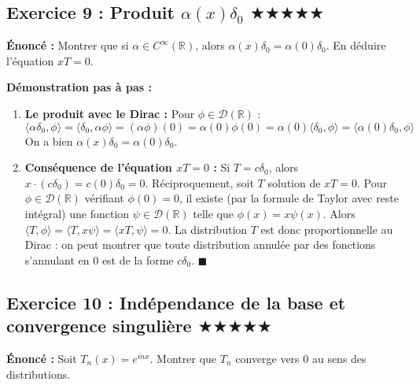 \documentclass[11pt,a4paper]{article}
\begin{document}
\subsection*{Exercice 9 : Produit $\alpha(x) \delta_0$ \quad $\bigstar\bigstar\bigstar\bigstar\bigstar$}

\textbf{Énoncé :}
Montrer que si $\alpha \in C^\infty(\mathbb{R})$, alors $\alpha(x) \delta_0 = \alpha(0) \delta_0$. En déduire l'équation $x T = 0$.

\textbf{Démonstration pas à pas :}
\begin{enumerate}
\item \textbf{Le produit avec le Dirac :} Pour $\phi \in \mathcal{D}(\mathbb{R})$ :
   $$ \langle \alpha \delta_0, \phi \rangle = \langle \delta_0, \alpha \phi \rangle = (\alpha \phi)(0) = \alpha(0) \phi(0) = \alpha(0) \langle \delta_0, \phi \rangle = \langle \alpha(0) \delta_0, \phi \rangle $$
   On a bien $\alpha(x) \delta_0 = \alpha(0) \delta_0$.
\item \textbf{Conséquence de l'équation $x T = 0$ :} Si $T = c \delta_0$, alors $x \cdot (c \delta_0) = c (0) \delta_0 = 0$.
   Réciproquement, soit $T$ solution de $xT = 0$. Pour $\phi \in \mathcal{D}(\mathbb{R})$ vérifiant $\phi(0) = 0$, il existe (par la formule de Taylor avec reste intégral) une fonction $\psi \in \mathcal{D}(\mathbb{R})$ telle que $\phi(x) = x \psi(x)$.
   Alors $\langle T, \phi \rangle = \langle T, x \psi \rangle = \langle xT, \psi \rangle = 0$.
   La distribution $T$ est donc proportionnelle au Dirac : on peut montrer que toute distribution annulée par des fonctions s'annulant en 0 est de la forme $c \delta_0$. $\blacksquare$
\end{enumerate}




\subsection*{Exercice 10 : Indépendance de la base et convergence singulière \quad $\bigstar\bigstar\bigstar\bigstar\bigstar$}

\textbf{Énoncé :}
Soit $T_n(x) = e^{inx}$. Montrer que $T_n$ converge vers 0 au sens des distributions.
\end{document}
